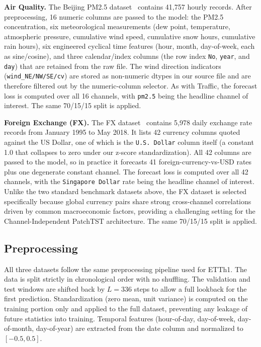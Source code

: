 \documentclass[11pt]{article}
\begin{document}
\textbf{Air Quality.} The Beijing PM2.5 dataset~\cite{air_dataset} contains 41,757 hourly records. After preprocessing, 16 numeric columns are passed to the model: the PM2.5 concentration, six meteorological measurements (dew point, temperature, atmospheric pressure, cumulative wind speed, cumulative snow hours, cumulative rain hours), six engineered cyclical time features (hour, month, day-of-week, each as sine/cosine), and three calendar/index columns (the row index \texttt{No}, \texttt{year}, and \texttt{day}) that are retained from the raw file. The wind direction indicators (\texttt{wind\_NE/NW/SE/cv}) are stored as non-numeric dtypes in our source file and are therefore filtered out by the numeric-column selector. As with Traffic, the forecast loss is computed over all 16 channels, with \texttt{pm2.5} being the headline channel of interest. The same 70/15/15 split is applied.

\textbf{Foreign Exchange (FX).} The FX dataset~\cite{fx_dataset} contains 5,978 daily exchange rate records from January 1995 to May 2018. It lists 42 currency columns quoted against the US Dollar, one of which is the \texttt{U.S. Dollar} column itself (a constant 1.0 that collapses to zero under our z-score standardization). All 42 columns are passed to the model, so in practice it forecasts 41 foreign-currency-vs-USD rates plus one degenerate constant channel. The forecast loss is computed over all 42 channels, with the \texttt{Singapore Dollar} rate being the headline channel of interest. Unlike the two standard benchmark datasets above, the FX dataset is selected specifically because global currency pairs share strong cross-channel correlations driven by common macroeconomic factors, providing a challenging setting for the Channel-Independent PatchTST architecture. The same 70/15/15 split is applied.

\subsection{Preprocessing}

All three datasets follow the same preprocessing pipeline used for ETTh1. The data is split strictly in chronological order with no shuffling. The validation and test windows are shifted back by $L{=}336$ steps to allow a full lookback for the first prediction. Standardization (zero mean, unit variance) is computed on the training portion only and applied to the full dataset, preventing any leakage of future statistics into training. Temporal features (hour-of-day, day-of-week, day-of-month, day-of-year) are extracted from the date column and normalized to $[-0.5, 0.5]$.
\end{document}
